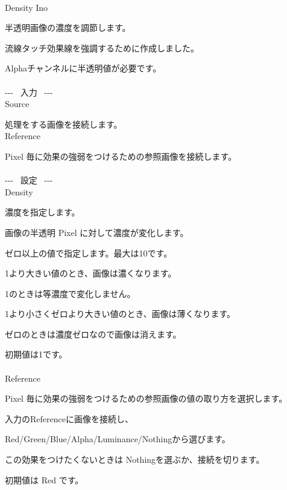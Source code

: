\documentclass[a4paper,12pt]{article}
\begin{document}
\thispagestyle{empty}

\Large
\noindent \\
Density Ino\medskip
\par
\normalsize
半透明画像の濃度を調節します。\par
流線タッチ効果線を強調するために作成しました。\par
Alphaチャンネルに半透明値が必要です。\\
\\
-{-}- \ 入力 \ -{-}-\\
Source\par
処理をする画像を接続します。\\
Reference\par
Pixel 毎に効果の強弱をつけるための参照画像を接続します。\\
\\
-{-}- \ 設定 \ -{-}-\\
Density\par
濃度を指定します。\par
画像の半透明 Pixel に対して濃度が変化します。\par
ゼロ以上の値で指定します。最大は10です。\par
1より大きい値のとき、画像は濃くなります。\par
1のときは等濃度で変化しません。\par
1より小さくゼロより大きい値のとき、画像は薄くなります。\par
ゼロのときは濃度ゼロなので画像は消えます。\par
初期値は1です。\\
\\
Reference\par
Pixel 毎に効果の強弱をつけるための参照画像の値の取り方を選択します。\par
入力の\textquotedbl Reference\textquotedbl に画像を接続し、\par
Red/Green/Blue/Alpha/Luminance/Nothingから選びます。\par
この効果をつけたくないときは Nothingを選ぶか、接続を切ります。\par
初期値は Red です。
\end{document}
